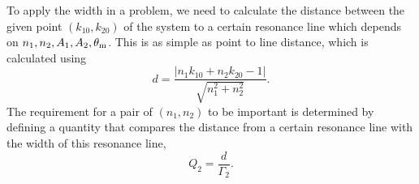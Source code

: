 











To apply the width in a problem, we need to calculate the distance between the given point $(k_{10},k_{20})$ of the system to a certain resonance line which depends on $n_1,n_2,A_1,A_2,\theta_\mathrm m$. This is as simple as point to line distance, which is calculated using
\begin{equation}
   d = \frac{\lvert n_1 k_{10} + n_2 k_{20} - 1 \rvert}{\sqrt{n_1^2 + n_2^2} }.
   \label{stimulated-2-freq-distance-0}
\end{equation}
The requirement for a pair of $(n_1,n_2)$ to be important is determined by defining a quantity that compares the distance from a certain resonance line with the width of this resonance line,
\begin{equation}
   Q_2 = \frac{d}{\Gamma_2}.
\end{equation}




